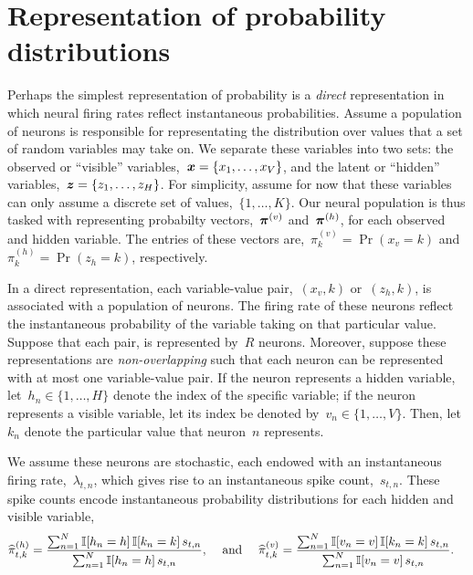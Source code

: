 \section{Representation of probability distributions}

\sloppy
Perhaps the simplest representation of probability is a \emph{direct}
representation in which neural firing rates reflect instantaneous
probabilities. Assume a population of neurons is responsible for
representating the distribution over values that a set of random
variables may take on. We separate these variables into two sets: the
observed or ``visible'' variables,~${\boldsymbol{x} = \{x_1, \ldots, x_V\}}$, and the
latent or ``hidden'' variables,~${\boldsymbol{z} = \{z_1, \ldots, z_H\}}$.  For
simplicity, assume for now that these variables can only assume a
discrete set of values,~${\{1, \ldots, K\}}$.   Our
neural population is thus tasked with representing probabilty
vectors,~$\boldsymbol{\pi}^{(v)}$ and~$\boldsymbol{\pi}^{(h)}$, for each observed and hidden
variable. The entries of these vectors are,~${\pi^{(v)}_k =
  \Pr(x_v=k)}$ and~${\pi^{(h)}_k = \Pr(z_h=k)}$, respectively.

In a direct representation, each variable-value pair,~$(x_v, k)$
or~$(z_h,k)$, is associated with a population of neurons. The firing
rate of these neurons reflect the instantaneous probability of the
variable taking on that particular value.  Suppose that each
pair, is represented by~$R$ neurons. Moreover, suppose
these representations are \emph{non-overlapping} such that each neuron
can be represented with at most one variable-value pair.
If the neuron represents a hidden variable, let~${h_n \in \{1, \ldots, H\}}$
denote the index of the specific variable; if the neuron represents
a visible variable, let its index be denoted by~${v_n \in \{1, \ldots, V\}}$.
Then, let~$k_n$ denote the particular value that neuron~$n$ represents.

We assume these neurons are stochastic, each endowed
with an instantaneous firing rate,~$\lambda_{t,n}$, which gives rise to an
instantaneous spike count,~$s_{t,n}$. These spike counts encode
instantaneous probability distributions for each hidden and visible variable,
\begin{align}
  \widehat{\pi}_{t,k}^{(h)} &=
  \frac{\sum_{n=1}^N \mathbb{I}[h_n=h] \, \mathbb{I}[k_n=k] \, s_{t,n}}
       {\sum_{n=1}^N \mathbb{I}[h_n=h] \, s_{t,n}}, &\text{ and }& &
       \widehat{\pi}_{t,k}^{(v)} &=
  \frac{\sum_{n=1}^N \mathbb{I}[v_n=v] \, \mathbb{I}[k_n=k] \, s_{t,n}}
       {\sum_{n=1}^N \mathbb{I}[v_n=v] \, s_{t,n}}.
\end{align}

